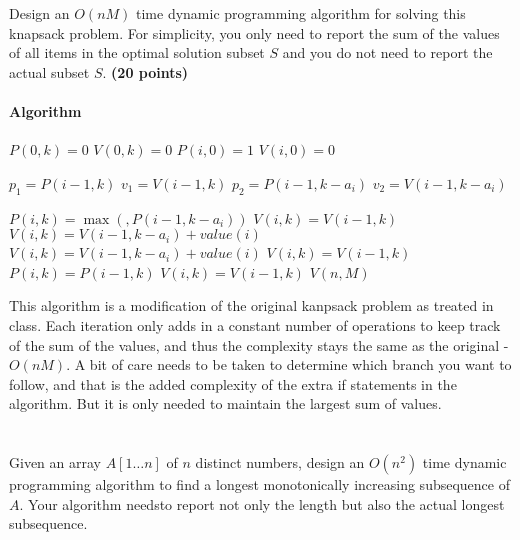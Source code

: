 \documentclass{article}
\begin{document}
Design an $O(nM)$ time dynamic programming algorithm for solving this
knapsack problem. For simplicity, you only need to report the sum of
the values of all items in the optimal solution subset $S$ and you do
not need to report the actual subset $S$. {\bf (20 points)}

\paragraph{Algorithm}
{\singlespacing
\begin{algorithmic}
      \State $P(0,k) = 0$
      \State $V(0,k) = 0$
    \EndFor
      \State $P(i,0) = 1$
      \State $V(i,0) = 0$
    \EndFor
    
          \State $p_1 = P(i-1,k)$
          \State $v_1 = V(i-1,k)$
          \State $p_2 = P(i-1,k-a_i)$
          \State $v_2 = V(i-1,k-a_i)$
          
          \State $P(i,k) = \max\left(,P(i-1,k-a_i)\right)$
              \State $V(i,k) = V(i-1,k)$
            \Else
              \State $V(i,k) = V(i-1,k-a_i) + value(i)$
            \EndIf
          \Else
              \State $V(i,k) = V(i-1,k-a_i) + value(i)$
            \Else
              \State $V(i,k) = V(i-1,k)$
            \EndIf
          \EndIf
        \Else
          \State $P(i,k) = P(i-1,k)$
          \State $V(i,k) = V(i-1,k)$
        \EndIf  
      \EndFor
    \EndFor
     $V(n,M)$
\EndFunction    
\end{algorithmic}
}
This algorithm is a modification of the original kanpsack problem as
treated in class.  Each iteration only adds in a constant number of
operations to keep track of the sum of the values, and thus the
complexity stays the same as the original - $O(nM)$.  A bit of care
needs to be taken to determine which branch you want to follow, and
that is the added complexity of the extra if statements in the
algorithm. But it is only needed to maintain the largest sum of
values. 





\section{}
Given an array $A[1 \dots n]$ of $n$ distinct numbers, design an
$O(n^2 )$ time dynamic programming algorithm to find a longest
monotonically increasing subsequence of $A$. Your algorithm needsto
report not only the length but also the actual longest subsequence. 
\end{document}
